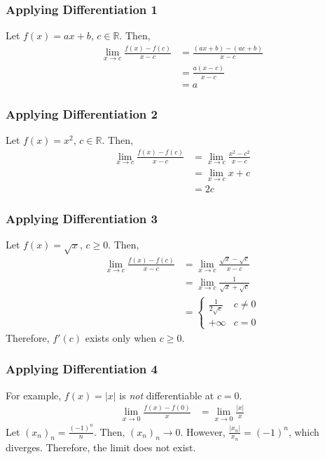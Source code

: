 \documentclass[10pt]{extarticle}
\newcommand{\R}{\mathbb{R}}
\begin{document}
  \subsubsection{Applying Differentiation 1}%
    Let $f(x) = ax+b$, $c\in\R$. Then,
    \begin{align*}
      \lim_{x\rightarrow c} \frac{f(x) - f(c)}{x-c} &= \frac{(ax+b) - (ac+b)}{x-c}\\
                              &= \frac{a(x-c)}{x-c}\\
                              &= a
    \end{align*}
  \subsubsection{Applying Differentiation 2}%
    Let $f(x) = x^2$, $c\in\R$. Then,
    \begin{align*}
      \lim_{x\rightarrow c}\frac{f(x) - f(c)}{x-c} &= \lim_{x\rightarrow c}\frac{x^2 - c^2}{x-c}\\
                                                   &= \lim_{x\rightarrow c} x+c\\
                                                   &= 2c
    \end{align*}
  \subsubsection{Applying Differentiation 3}%
    Let $f(x) = \sqrt{x}$, $c \geq 0$. Then,
    \begin{align*}
      \lim_{x\rightarrow c} \frac{f(x) - f(c)}{x-c} &= \lim_{x\rightarrow c}\frac{\sqrt{x} - \sqrt{c}}{x-c}\\
                                                    &= \lim_{x\rightarrow c}\frac{1}{\sqrt{x} + \sqrt{c}}\\
                                                    &= \begin{cases}
                                                      \frac{1}{2\sqrt{c}} & c \neq 0\\
                                                      +\infty & c = 0
                                                    \end{cases}
    \end{align*}
    Therefore, $f'(c)$ exists only when $c\geq 0$.
  \subsubsection{Applying Differentiation 4}%
    For example, $f(x) = |x|$ is \textit{not} differentiable at $c=0$.
    \begin{align*}
      \lim_{x\rightarrow 0}\frac{f(x) - f(0)}{x} &= \lim_{x\rightarrow 0}\frac{|x|}{x}
    \end{align*}
    Let $(x_n)_n = \frac{(-1)^n}{n}$. Then, $(x_n)_n \rightarrow 0$. However, $\frac{|x_n|}{x_n} = (-1)^{n}$, which diverges. Therefore, the limit does not exist.
\end{document}
